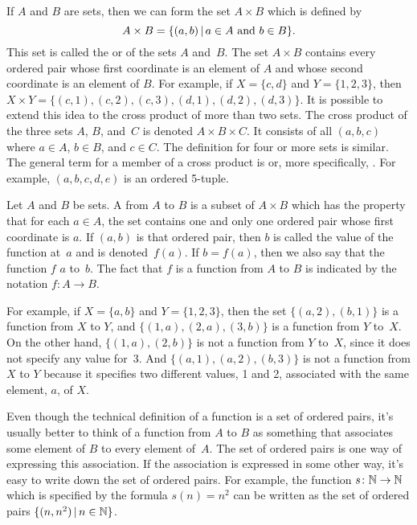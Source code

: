 If $A$ and $B$ are sets, then we can form the set
$A\times B$ which is defined by \[A\times B=
\{(a,b)\,|\, a\in A \text{ and } b\in B\}.\]
This set is called the  or
 of the sets $A$ and~$B$.
The set $A\times B$ contains every ordered pair whose first
coordinate is an element of $A$ and whose second coordinate is
an element of $B$.  For example, if $X=\{c,d\}$ and
$Y=\{1,2,3\}$, then $X\times Y=\{(c,1), (c,2), (c,3), (d,1),(d,2), (d,3)\}$.
It is possible to extend this idea to the cross product
of more than two sets.  The cross product of the three sets
$A$, $B$, and~$C$ is denoted $A\times B\times C$.  It consists
of all  $(a,b,c)$
where $a\in A$, $b\in B$, and $c\in C$.  The definition for
four or more sets is similar.  The general term for a member
of a cross product is  or, more specifically,
.  For example, $(a,b,c,d,e)$ is
an ordered 5-tuple.

\begin{definition}
Let $A$ and $B$ be sets.  A  from $A$ to $B$ is a subset of $A\times B$ which has the property that for each $a\in A$, the set contains one and only one ordered pair whose first coordinate is $a$.
If $(a,b)$ is that ordered pair, then $b$ is called the value of the function at~$a$ and is denoted~$f(a)$.
If $b=f(a)$, then we also say that the function $f$  $a$ to~$b$.
The fact that $f$ is a function from $A$ to $B$ is indicated by the notation $f\colon A\to B$.
\end{definition}

For example, if $X=\{a,b\}$ and $Y=\{1,2,3\}$, then the set $\{(a,2), (b,1)\}$ is a function from $X$ to $Y$, and $\{(1,a), (2,a), (3,b)\}$ is a function from $Y$ to~$X$.
On the other hand, $\{(1,a),(2,b)\}$ is not a function from $Y$ to~$X$, since it does not specify any value for~3.
And $\{(a,1),(a,2),(b,3)\}$ is not a function from $X$ to $Y$ because it specifies two different values, 1 and 2, associated with the same element, $a$, of $X$.

Even though the technical definition of a function is a set
of ordered pairs, it's usually better to think of a function
from $A$ to $B$ as something that associates some element of
$B$ to every element of~$A$.  The set of ordered pairs is one
way of expressing this association.  If the association is
expressed in some other way, it's easy to write down the
set of ordered pairs.  For example, the function
$s\colon{\mathbb N}\to{\mathbb N}$ which is specified by the formula
$s(n)=n^2$ can be written as the set of ordered
pairs $\{(n,n^2)\,|\, n\in {\mathbb N}\}$.

